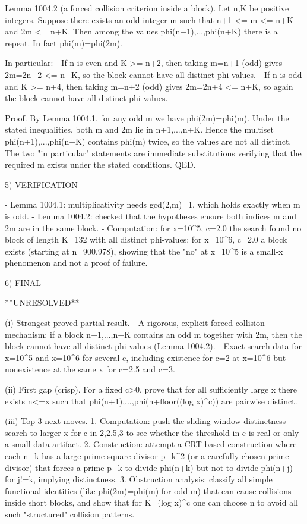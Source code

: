 Lemma 1004.2 (a forced collision criterion inside a block).
Let n,K be positive integers. Suppose there exists an odd integer m such that
  n+1 <= m <= n+K  and  2m <= n+K.
Then among the values phi(n+1),...,phi(n+K) there is a repeat.
In fact phi(m)=phi(2m).

In particular:
- If n is even and K >= n+2, then taking m=n+1 (odd) gives 2m=2n+2 <= n+K, so the block cannot have all distinct phi-values.
- If n is odd and K >= n+4, then taking m=n+2 (odd) gives 2m=2n+4 <= n+K, so again the block cannot have all distinct phi-values.

Proof.
By Lemma 1004.1, for any odd m we have phi(2m)=phi(m).
Under the stated inequalities, both m and 2m lie in {n+1,...,n+K}. Hence the multiset {phi(n+1),...,phi(n+K)} contains phi(m) twice, so the values are not all distinct.
The two "in particular" statements are immediate substitutions verifying that the required m exists under the stated conditions.  QED.

5) VERIFICATION

- Lemma 1004.1: multiplicativity needs gcd(2,m)=1, which holds exactly when m is odd.
- Lemma 1004.2: checked that the hypotheses ensure both indices m and 2m are in the same block.
- Computation: for x=10^5, c=2.0 the search found no block of length K=132 with all distinct phi-values; for x=10^6, c=2.0 a block exists (starting at n=900,978), showing that the "no" at x=10^5 is a small-x phenomenon and not a proof of failure.

6) FINAL

**UNRESOLVED**

(i) Strongest proved partial result.
- A rigorous, explicit forced-collision mechanism: if a block {n+1,...,n+K} contains an odd m together with 2m, then the block cannot have all distinct phi-values (Lemma 1004.2).
- Exact search data for x=10^5 and x=10^6 for several c, including existence for c=2 at x=10^6 but nonexistence at the same x for c=2.5 and c=3.

(ii) First gap (crisp).
For a fixed c>0, prove that for all sufficiently large x there exists n<=x such that phi(n+1),...,phi(n+floor((log x)^c)) are pairwise distinct.

(iii) Top 3 next moves.
1. Computation: push the sliding-window distinctness search to larger x for c in {2,2.5,3} to see whether the threshold in c is real or only a small-data artifact.
2. Construction: attempt a CRT-based construction where each n+k has a large prime-square divisor p_k^2 (or a carefully chosen prime divisor) that forces a prime p_k to divide phi(n+k) but not to divide phi(n+j) for j!=k, implying distinctness.
3. Obstruction analysis: classify all simple functional identities (like phi(2m)=phi(m) for odd m) that can cause collisions inside short blocks, and show that for K=(log x)^c one can choose n to avoid all such "structured" collision patterns.

